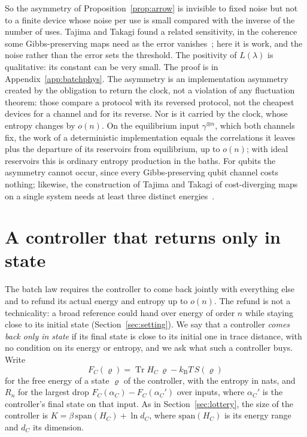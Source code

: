 \documentclass[11pt]{article}
\theoremstyle{definition}
\theoremstyle{remark}
\newcommand{\Tr}{\operatorname{Tr}}
\newcommand{\kB}{k_{\mathrm B}}
\begin{document}
So the asymmetry of Proposition~\ref{prop:arrow} is invisible to fixed noise but not to a finite device whose noise per use is small compared with the inverse of the number of uses. Tajima and Takagi found a related sensitivity, in the coherence some Gibbs-preserving maps need as the error vanishes~\cite{TajimaTakagi25}; here it is work, and the noise rather than the error sets the threshold. The positivity of $L(\lambda)$ is qualitative: its constant can be very small. The proof is in Appendix~\ref{app:batchphys}. The asymmetry is an implementation asymmetry created by the obligation to return the clock, not a violation of any fluctuation theorem: those compare a protocol with its reversed protocol, not the cheapest devices for a channel and for its reverse. Nor is it carried by the clock, whose entropy changes by $o(n)$. On the equilibrium input $\gamma^{\otimes n}$, which both channels fix, the work of a deterministic implementation equals the correlations it leaves plus the departure of its reservoirs from equilibrium, up to $o(n)$; with ideal reservoirs this is ordinary entropy production in the baths. For qubits the asymmetry cannot occur, since every Gibbs-preserving qubit channel costs nothing; likewise, the construction of Tajima and Takagi of cost-diverging maps on a single system needs at least three distinct energies~\cite{TajimaTakagi25}.

\section{A controller that returns only in state}\label{sec:embezzle}

The batch law requires the controller to come back jointly with everything else and to refund its actual energy and entropy up to $o(n)$. The refund is not a technicality: a broad reference could hand over energy of order $n$ while staying close to its initial state (Section~\ref{sec:setting}). We say that a controller \emph{comes back only in state} if its final state is close to its initial one in trace distance, with no condition on its energy or entropy, and we ask what such a controller buys. Write
\[
F_C(\varrho)=\Tr H_C\,\varrho-\kB T\,S(\varrho)
\]
for the free energy of a state $\varrho$ of the controller, with the entropy in nats, and $R_n$ for the largest drop $F_C(\alpha_C)-F_C(\alpha_C')$ over inputs, where $\alpha_C'$ is the controller's final state on that input. As in Section~\ref{sec:lottery}, the size of the controller is $K=\beta\,\mathrm{span}(H_C)+\ln d_C$, where $\mathrm{span}(H_C)$ is its energy range and $d_C$ its dimension.
\end{document}
